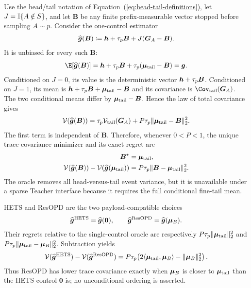 Use the head/tail notation of Equation~(\ref{eq:head-tail-definitions}), let
$J=\mathbb{I}\{A\notin S\}$, and let $\bm B$ be any finite prefix-measurable vector
stopped before sampling $A\sim p$. Consider the one-control estimator
\begin{equation}
 \widehat{\bm{g}}(\bm B)
 \coloneqq
 \bm{h}+\tau_p\bm B+J(\bm{G}_A-\bm B).
 \label{eq:single-control-estimator}
\end{equation}
It is unbiased for every such $\bm B$:
\begin{equation}
 \E[\widehat{\bgrad}(\bm B)]
 =\bhead+\tau_p\bm B
  +\tau_p(\bmean_{\mathrm{tail}}-\bm B)
 =\bgrad.
 \label{eq:single-control-unbiased}
\end{equation}
Conditioned on $J=0$, its value is the deterministic vector
$\bm{h}+\tau_p\bm B$. Conditioned on $J=1$, its mean is
$\bm{h}+\tau_p\bm B+\bm{\mu}_{\mathrm{tail}}-\bm B$ and its covariance is
$\Cov_{\mathrm{tail}}(\btoken_A)$. The two conditional means differ by
$\bm{\mu}_{\mathrm{tail}}-\bm B$. Hence the law of total covariance gives
\begin{equation}
 \mathcal V(\widehat{\bm{g}}(\bm B))
 =\tau_p\mathcal V_{\mathrm{tail}}(\bm{G}_A)
 +P\tau_p\lVert\bm{\mu}_{\mathrm{tail}}-\bm B\rVert_2^2.
 \label{eq:single-control-variance}
\end{equation}
The first term is independent of $\bm B$. Therefore, whenever
$0<P<1$, the unique trace-covariance minimizer and its exact regret are
\begin{equation}
 \begin{aligned}
 \bm B^\star&=\bm{\mu}_{\mathrm{tail}},\\
 \mathcal V(\widehat{\bm{g}}(\bm B))
 -\mathcal V(\widehat{\bm{g}}(\bm{\mu}_{\mathrm{tail}}))
 &=P\tau_p\lVert\bm B-\bm{\mu}_{\mathrm{tail}}\rVert_2^2.
 \end{aligned}
 \label{eq:single-control-oracle}
\end{equation}
The oracle removes all head-versus-tail event variance, but it is unavailable
under a sparse Teacher interface because it requires the full conditional
fine-tail mean.

HETS and ResOPD are the two payload-compatible choices
\begin{equation}
 \widehat{\bm{g}}^{\mathrm{HETS}}=\widehat{\bm{g}}(\bm 0),
 \qquad
 \widehat{\bm{g}}^{\mathrm{ResOPD}}=\widehat{\bm{g}}(\bm{\mu}_B).
\end{equation}
Their regrets relative to the single-control oracle are respectively
$P\tau_p\lVert\bm{\mu}_{\mathrm{tail}}\rVert_2^2$ and
$P\tau_p\lVert\bm{\mu}_{\mathrm{tail}}-\bm{\mu}_B\rVert_2^2$. Subtraction yields
\begin{equation}
  \mathcal{V}(\widehat{\bm{g}}^{\mathrm{HETS}}) - \mathcal{V}(\widehat{\bm{g}}^{\mathrm{ResOPD}}) = P\tau_p \!\left( 2\langle\bm{\mu}_{\mathrm{tail}}, \bm{\mu}_B\rangle - \lVert\bm{\mu}_B\rVert_2^2 \right).
  \label{eq:hets-cfr-variance-appendix}
\end{equation}
Thus ResOPD has lower trace covariance exactly when $\bm{\mu}_B$ is closer to
$\bm{\mu}_{\mathrm{tail}}$ than the HETS control $\bm 0$ is; no unconditional
ordering is asserted.

